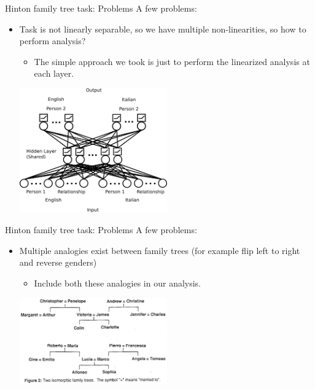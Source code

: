 \documentclass{beamer}
\begin{document}
\begin{frame}{Hinton family tree task: Problems}
A few problems:
\begin{itemize}
    \item<1-> Task is not linearly separable, so we have multiple non-linearities, so how to perform analysis?
    \begin{itemize}
	\item<2-> The simple approach we took is just to perform the linearized analysis at each layer. 
    \end{itemize}
     {
    \begin{center}
	\includegraphics[width = 0.5\textwidth]{../writing/cogsci_2017/figures/family_tree_network_diagram.png}

    \end{center}
    }
\end{itemize}
\end{frame}

\begin{frame}{Hinton family tree task: Problems}
A few problems:
\begin{itemize}
    \item<1-> Multiple analogies exist between family trees (for example flip left to right and reverse genders) 
    \begin{itemize}
	\item<2-> Include both these analogies in our analysis. 
    \end{itemize}
     {
    \begin{center}
	\includegraphics[width = 0.5\textwidth]{../writing/cogsci_2017/figures/hinton_family_tree_figure.png}
    \end{center}
    }
\end{itemize}
\end{frame}
\end{document}
